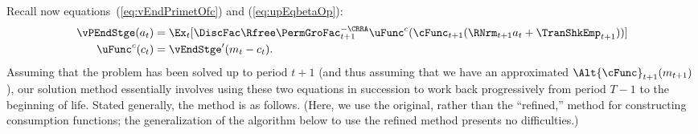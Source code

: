 \documentclass[titlepage, headings=optiontotocandhead]{\econtex}
\begin{document}
Recall now equations~(\ref{eq:vEndPrimetOfc}) and (\ref{eq:upEqbetaOp}):
\begin{equation*}\begin{gathered}\begin{aligned}
      \vPEndStge({a}_{t})  & = \Ex_{t}[\DiscFac \Rfree \PermGroFac_{t+1}^{-\CRRA}
      \uFunc^{{c}}(\cFunc_{t+1}(\RNrm_{t+1} {a}_{t}+{\TranShkEmp}_{t+1}))]
      \\\uFunc^{{c}}({c}_{t})   & = \vEndStge^{\prime}({m}_{t}-{c}_{t}).
    \end{aligned}\end{gathered}\end{equation*}
Assuming that the problem has been solved up to period $t+1$ (and thus
assuming that we have an approximated $\Alt{\cFunc}_{t+1}({m}_{t+1})$), our solution method essentially
involves using these two equations in succession to work back
progressively from period $T-1$ to the beginning of life.  Stated
generally, the method is as follows.  (Here, we use the original, rather than the ``refined,'' method for 
constructing consumption functions; the generalization of the algorithm below to use the refined method presents
no difficulties.)
\end{document}
